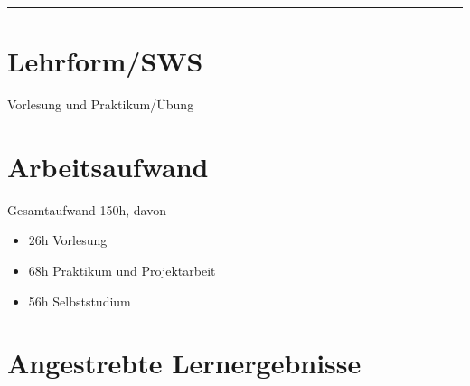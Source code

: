 \begin{center}\rule{0.5\linewidth}{0.5pt}\end{center}

\hypertarget{lehrformswspathlabel....srcmodulbeschreibungen-bachelor-bpo5ba_mensch-computer_interaktion}{%
\section*{Lehrform/SWS\label{../../src/modulbeschreibungen-bachelor-bpo5/BA_Mensch-Computer_Interaktion}}\label{lehrformswspathlabel....srcmodulbeschreibungen-bachelor-bpo5ba_mensch-computer_interaktion}}

Vorlesung und Praktikum/Übung

\hypertarget{arbeitsaufwandpathlabel....srcmodulbeschreibungen-bachelor-bpo5ba_mensch-computer_interaktion}{%
\section*{Arbeitsaufwand\label{../../src/modulbeschreibungen-bachelor-bpo5/BA_Mensch-Computer_Interaktion}}\label{arbeitsaufwandpathlabel....srcmodulbeschreibungen-bachelor-bpo5ba_mensch-computer_interaktion}}

Gesamtaufwand 150h, davon

\begin{itemize}
\tightlist
\item
  26h Vorlesung
\item
  68h Praktikum und Projektarbeit
\item
  56h Selbststudium
\end{itemize}

\hypertarget{angestrebte-lernergebnissepathlabel....srcmodulbeschreibungen-bachelor-bpo5ba_mensch-computer_interaktion}{%
\section*{Angestrebte
Lernergebnisse\label{../../src/modulbeschreibungen-bachelor-bpo5/BA_Mensch-Computer_Interaktion}}\label{angestrebte-lernergebnissepathlabel....srcmodulbeschreibungen-bachelor-bpo5ba_mensch-computer_interaktion}}

